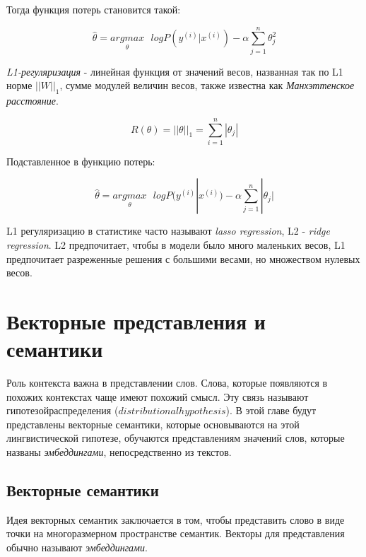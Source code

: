 \documentclass[a4paper,12pt,preview]{report} %
\begin{document}
	Тогда функция потерь становится такой:
	
	\begin{equation}
	\hat{\theta} = \underset{\theta}{argmax} \text{ } logP(y^{(i)} | x^{(i)}) - \alpha \sum_{j=1}^{n} \theta_j^2
	\end{equation}
	
	\textit{L1-регуляризация} - линейная функция от значений весов, названная так по L1 норме $||W||_1$, сумме модулей величин весов, также известна как \textit{Манхэттенское расстояние}.
	
	\begin{equation}
	R(\theta) = ||\theta||_1 = \sum_{i=1}^n |\theta_j|
	\end{equation}   
	
	Подставленное в функцию потерь:
	
	\begin{equation}
	\hat{\theta} = \underset{\theta}{argmax} \text{ } logP(y^{(i)} | x^{(i)}) - \alpha \sum_{j=1}^{n} |\theta_j|
	\end{equation}
	
	L1 регуляризацию в статистике часто называют \textit{lasso regression}, L2 - \textit{ridge regression}. L2 предпочитает, чтобы в модели было много  маленьких весов, L1 предпочитает разреженные решения с большими весами, но множеством нулевых весов.
	
	
	\section{Векторные представления и семантики}
	
	Роль контекста важна в представлении слов. Слова, которые появляются в похожих контекстах чаще имеют похожий смысл. Эту связь называют $гипотезой распределения$ ($distributional hypothesis$). В этой главе будут представлены векторные семантики, которые основываются на этой лингвистической гипотезе, обучаются представлениям значений слов, которые названы \textit{эмбеддингами}, непосредственно из текстов. 
	
	
	\subsection{Векторные семантики}
	
	Идея векторных семантик заключается в том, чтобы представить слово в виде точки на многоразмерном пространстве семантик. Векторы для представления обычно называют \textit{эмбеддингами}. 
	
\end{document}
